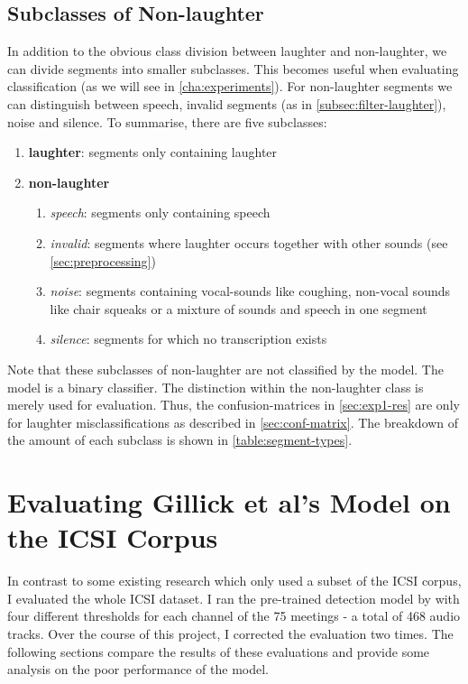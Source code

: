 \documentclass[bsc,frontabs,parskip,deptreport]{infthesis}
\begin{document}
\subsection{Subclasses of Non-laughter}
In addition to the obvious class division between laughter and non-laughter, we can divide segments into smaller subclasses. This becomes useful when evaluating classification (as we will see in \autoref{cha:experiments}).
For non-laughter segments we can distinguish between speech, invalid segments (as in \autoref{subsec:filter-laughter}), noise and silence.
To summarise, there are five subclasses:
\begin{enumerate}
    \item \textbf{laughter}: segments only containing laughter
    \item \textbf{non-laughter}
    \begin{enumerate}
        \item \textit{speech}: segments only containing speech
        \item \textit{invalid}: segments where laughter occurs together with other sounds (see \autoref{sec:preprocessing})
        \item \textit{noise}: segments containing vocal-sounds like coughing, non-vocal sounds like chair squeaks or a mixture of sounds and speech in one segment
        \item \textit{silence}: segments for which no transcription exists
    \end{enumerate}
\end{enumerate}
Note that these subclasses of non-laughter are not classified by the model. The model is a binary classifier. The distinction within the non-laughter class is merely used for evaluation.
Thus, the confusion-matrices in \autoref{sec:exp1-res} are only for laughter misclassifications as described in \autoref{sec:conf-matrix}.
The breakdown of the amount of each subclass is shown in \autoref{table:segment-types}.


\section{Evaluating Gillick et al's Model on the ICSI Corpus}
In contrast to some existing research \citep{kennedy2004laughter, knox2006automatic} which only used a subset of the ICSI corpus, I evaluated the whole ICSI dataset.
I ran the pre-trained detection model by \citet{gillick2021robust} with four different thresholds for each channel of the 75 meetings - a total of 468 audio tracks. 
Over the course of this project, I corrected the evaluation two times.
The following sections compare the results of these evaluations and provide some analysis on the poor performance of the model.
\end{document}
